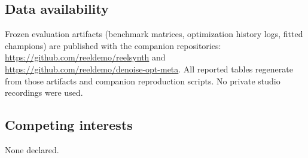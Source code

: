 \subsection{Data availability}
\label{sec:data-availability}
Frozen evaluation artifacts (benchmark matrices, optimization history logs, fitted champions) are published with the companion repositories:
\url{https://github.com/reeldemo/reelsynth} and
\url{https://github.com/reeldemo/denoise-opt-meta}.
All reported tables regenerate from those artifacts and companion reproduction scripts.
No private studio recordings were used.

\subsection{Competing interests}
\label{sec:competing}
None declared.
